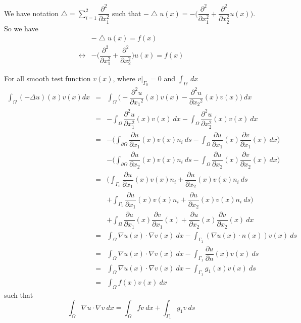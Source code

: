 \documentclass[a4paper,10pt]{article}
\begin{document}
We have notation $ \bigtriangleup = \sum_{i=1}^{2} \dfrac{\partial^2}{\partial x_{1}^{2}} $ such that $ -\bigtriangleup u(x) = -\big( \dfrac{\partial^{2}}{\partial x_{1}^{2}} + \dfrac{\partial^{2}}{\partial x_{2}^{2}} u(x) \big) $. So we have
\begin{eqnarray}\nonumber
& -\bigtriangleup u(x) = f(x) \\ \nonumber
\leftrightarrow &  - \big( \dfrac{\partial^{2}}{\partial x_{1}^{2}} + \dfrac{\partial^{2}}{\partial x_{2}^{2}} \big) u(x) = f(x)
\end{eqnarray}

For all smooth test function $ v(x) $, where $ v|_{\Gamma_{0}}=0 $ and $ \int_{\Omega} \ dx $
\begin{eqnarray} \nonumber
 \int_\Omega (-\Delta u)(x) v(x) dx &=&\int_\Omega \Big(-\dfrac{\partial^2u}{\partial{x_1}^2} (x) v(x) -\dfrac{\partial^2u}{\partial{x_2}^2} (x) v(x) \Big) \ dx \\ \nonumber
&=& - \int_{\Omega} \dfrac{\partial^{2}u}{\partial x_{1}^{2}}  (x) v(x) \ dx - \int_{\Omega} \dfrac{\partial^{2} u}{\partial x_{2}^{2}} (x) v(x) \ dx\\ \nonumber
&=& - \Big( \int_{\partial \Omega} \dfrac{\partial u}{\partial x_{1}} (x) v(x) n_{i} \ ds - \int_{\Omega} \dfrac{\partial u}{\partial x_{1}} (x) \dfrac{\partial v}{\partial x_{1}} (x) \ dx \Big) \\ \nonumber
&& - \Big( \int_{\partial \Omega} \dfrac{\partial u}{\partial x_{2}} (x) v(x) n_{i} \ ds - \int_{\Omega} \dfrac{\partial u}{\partial x_{2}} (x) \dfrac{\partial v}{\partial x_{2}} (x) \ dx \Big) \\ \nonumber
&=& \Big( \int_{\Gamma_0} \dfrac{\partial u}{\partial x_{1}} (x) v(x) n_{i} + \dfrac{\partial u}{\partial x_{2}} (x) v(x) n_{i} \ ds \\ \nonumber
&& + \int_{\Gamma_1} \dfrac{\partial u}{\partial x_{1}} (x) v(x) n_{i} + \dfrac{\partial u}{\partial x_{2}} (x) v(x) n_{i} \ ds \Big) \\ \nonumber
&& + \int_{\Omega} \dfrac{\partial u}{\partial x_{1}} (x) \dfrac{\partial v}{\partial x_{1}} (x) + \dfrac{\partial u}{\partial x_{2}} (x) \dfrac{\partial v}{\partial x_{2}} (x) \ dx \\ \nonumber
&=& \int_{\Omega} \nabla u(x) \cdot \nabla v(x) \ dx - \int_{\Gamma_1} (\nabla u(x) \cdot n(x)) v(x) \ ds \\ \nonumber
&=& \int_{\Omega} \nabla u(x) \cdot \nabla v(x) \ dx - \int_{\Gamma_1} \dfrac{\partial u}{\partial n} (x) v(x) \ ds \\ \nonumber
&=& \int_{\Omega} \nabla u(x) \cdot \nabla v(x) \ dx - \int_{\Gamma_1} g_{1}(x) v(x) \ ds\\ \nonumber
&=& \int_{\Omega} f(x) v(x) \ dx
\end{eqnarray}
such that  
\begin{equation*}
\int_{\Omega} \nabla u \cdot \nabla v \ dx = \int_{\Omega} f v \ dx + \int_{\Gamma_1} g_{1} v \ ds
\end{equation*} 
\end{document}
